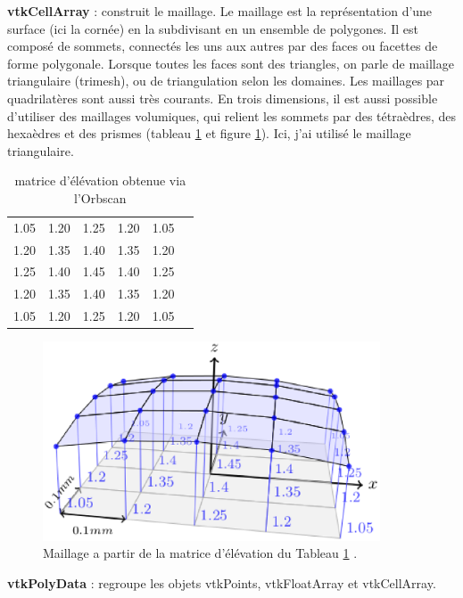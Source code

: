 \documentclass[a4paper,12pt]{article}
\begin{document}
\textbf{vtkCellArray}  : construit le maillage. Le maillage est la représentation d'une surface (ici la cornée) en la subdivisant en un ensemble de polygones. Il est composé de sommets,  connectés les uns aux autres par des faces ou facettes de forme polygonale. Lorsque toutes les faces sont des triangles, on parle de maillage triangulaire (trimesh), ou de triangulation selon les domaines. Les maillages par quadrilatères sont aussi très courants. En trois dimensions, il est aussi possible d'utiliser des maillages volumiques, qui relient les sommets par des tétraèdres, des hexaèdres et des prismes (tableau \ref{matriceElev} et figure \ref{fig:maillage}). Ici, j'ai utilisé le maillage triangulaire. 

\begin{table}[h]
	\centering
	\begin{tabular}{cccccc}
		1.05 & 1.20 & 1.25 & 1.20 & 1.05  \\
		1.20 & 1.35 & 1.40 & 1.35 & 1.20 \\
		1.25 & 1.40 & 1.45 & 1.40 & 1.25 \\
		1.20 & 1.35 & 1.40 & 1.35 & 1.20 \\
		1.05 & 1.20 & 1.25 & 1.20 & 1.05 
	\end{tabular}
	\caption{matrice d'élévation obtenue via l'Orbscan}
	\label{matriceElev}
\end{table}


\begin{figure}[h]
	\centering
	\includegraphics[width=10cm]{maillage.eps}  
	\caption{Maillage a partir de la matrice d'élévation du Tableau \ref{matriceElev} \cite{arnaud}. }
	\label{fig:maillage}
\end{figure} 

\vspace{0.25cm}

\textbf{vtkPolyData} : regroupe les objets vtkPoints, vtkFloatArray et vtkCellArray.
\vspace{0.25cm}
\end{document}
